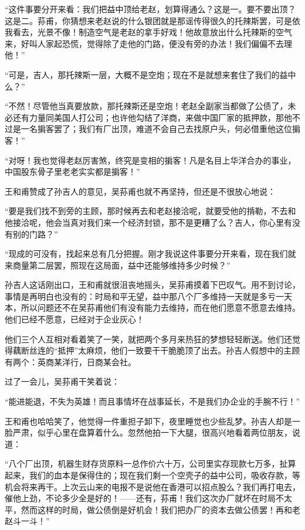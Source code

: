 \par “这件事要分开来看：我们把益中顶给老赵，划算得通么？这是一。要不要出顶？这是二。荪甫，你猜想来老赵说的什么银团就是那谣传得很久的托辣斯罢，可是依我看去，光景不像！制造空气是老赵的拿手好戏！他故意放出什么托辣斯的空气来，好叫人家起恐慌，觉得除了走他的门路，便没有旁的办法！我们偏偏不去理他！”
\par “可是，吉人，那托辣斯一层，大概不是空炮；现在不是就想来套住了我们的益中么？”
\par “不然！尽管他当真要放款，那托辣斯还是空炮！老赵全副家当都做了公债了，未必还有力量同美国人打公司；也许他勾结了洋商，来做中国厂家的抵押款，那他不过是一名掮客罢了；我们有厂出顶，难道不会自己去找原户头，何必借重他这位掮客！”
\par “对呀！我也觉得老赵厉害煞，终究是变相的掮客！凡是名目上华洋合办的事业，中国股东骨子里老老实实都是掮客！”
\par 王和甫赞成了孙吉人的意见，吴荪甫也就不再坚持，但还是不很放心地说：
\par “要是我们找不到旁的主顾，那时候再去和老赵接洽呢，就要受他的掯勒，不去和他接洽呢，他会当真对我们来一个经济封锁，那不是更糟了么？吉人，你心里有没有别的门路？”
\par “现成的可没有，找起来总有几分把握。刚才我说这件事要分开来看，现在我们就来商量第二层罢，照现在这局面，益中还能够维持多少时候？”
\par 孙吉人这话刚出口，王和甫就很沮丧地摇头，吴荪甫摸着下巴叹气。用不到讨论，事情是再明白也没有的：时局和平无望，益中那八个厂多维持一天就是多亏一天本，所以问题还不在吴荪甫他们有没有能力去维持，而在他们愿意不愿意去维持。他们已经不愿意，已经对于企业灰心！
\par 他们三个人互相对看着笑了一笑，就把两个多月来热狂的梦想轻轻断送。他们还觉得藕断丝连的“抵押”太麻烦，他们一致要干干脆脆顶了出去。孙吉人假想中的主顾有两个：英商某洋行，日商某会社。
\par 过了一会儿，吴荪甫干笑着说：
\par “能进能退，不失为英雄！而且事情坏在战事延长，不是我们办企业的手腕不行！”
\par 王和甫也哈哈笑了，他觉得一件重担子卸下，夜里睡觉也少些乱梦。孙吉人却是一脸严肃，似乎心里在盘算着什么。忽然他拍一下大腿，很高兴地看着两位朋友，说道：
\par “八个厂出顶，机器生财存货原料一总作价六十万，公司里实存现款七万多，扯算起来，我们的血本是保得住的；现在我们剩一个空壳子的益中公司，吸收存款，等机会将来再干。上次云山来的电报不是说他在香港可以招点股么？我们再打电去，催他上劲，不论多少全是好的！——还有，荪甫！我们这次办厂就坏在时局不太平，然而这样的时局，做公债倒是好机会！我们把办厂的资本去做公债罢！再和老赵斗一斗！”
